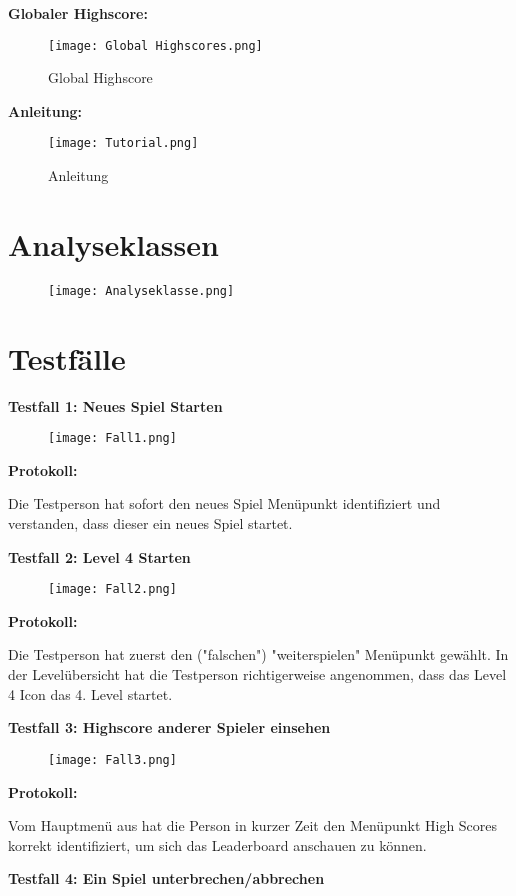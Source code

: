 \documentclass[12pt, a4paper]{article}
\begin{document}
\newpage
\textbf{Globaler Highscore:}
\begin{figure}[H]
\centering
\texttt{[image: Global Highscores.png]}
\caption{Global Highscore}
\end{figure}
\par\bigskip
\textbf{Anleitung:}
\begin{figure}[H]
\centering
\texttt{[image: Tutorial.png]}
\caption{Anleitung}
\end{figure}

\newpage
\section{Analyseklassen}
\begin{figure}[H]
\centering
\texttt{[image: Analyseklasse.png]}
\end{figure}

\newpage
\section{Testfälle}
\textbf{Testfall 1: Neues Spiel Starten}
\begin{figure}[H]
\centering
\texttt{[image: Fall1.png]}
\end{figure}
\textbf{Protokoll:}
\par\bigskip
Die Testperson hat sofort den neues Spiel Menüpunkt identifiziert und verstanden, dass dieser ein neues Spiel startet. 

\newpage
\textbf{Testfall 2: Level 4 Starten}
\begin{figure}[H]
\centering
\texttt{[image: Fall2.png]}
\end{figure}
\textbf{Protokoll:}
\par\bigskip
Die Testperson hat zuerst den ("falschen") "weiterspielen" Menüpunkt gewählt. In der Levelübersicht hat die Testperson richtigerweise angenommen, dass das Level 4 Icon das 4. Level startet.

\newpage
\textbf{Testfall 3: Highscore anderer Spieler einsehen}
\begin{figure}[H]
\centering
\texttt{[image: Fall3.png]}
\end{figure}
\textbf{Protokoll:}
\par\bigskip
Vom Hauptmenü aus hat die Person in kurzer Zeit den Menüpunkt High Scores korrekt identifiziert, um sich das Leaderboard anschauen zu können.

\newpage
\textbf{Testfall 4: Ein Spiel unterbrechen/abbrechen}
\end{document}
